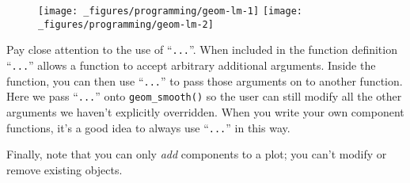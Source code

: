 \begin{Shaded}
\begin{Highlighting}[]
\StringTok{ } \StringTok{ } \NormalTok{(}\NormalTok{, }\NormalTok{), }
                     
  \NormalTok{(}  \NormalTok{, } \NormalTok{, } 
     
\NormalTok{\}}
 \NormalTok{/}\StringTok{ }\StringTok{ }
\StringTok{  }\NormalTok{() +}\StringTok{ }
\StringTok{  }\NormalTok{()}
 \NormalTok{/}\StringTok{ }\StringTok{ }
\StringTok{  }\NormalTok{() +}\StringTok{ }
\StringTok{  }\StringTok{ }\NormalTok{), } \NormalTok{, } \NormalTok{)}
\end{Highlighting}
\end{Shaded}

\begin{figure}[H]
  \centering
  \texttt{[image: \_figures/programming/geom-lm-1]}%
  \texttt{[image: \_figures/programming/geom-lm-2]}
\end{figure}

Pay close attention to the use of ``\texttt{...}''. When included in the
function definition ``\texttt{...}'' allows a function to accept
arbitrary additional arguments. Inside the function, you can then use
``\texttt{...}'' to pass those arguments on to another function. Here we
pass ``\texttt{...}'' onto \texttt{geom\_smooth()} so the user can still
modify all the other arguments we haven't explicitly overridden. When
you write your own component functions, it's a good idea to always use
``\texttt{...}'' in this way. 

Finally, note that you can only \emph{add} components to a plot; you
can't modify or remove existing objects.

